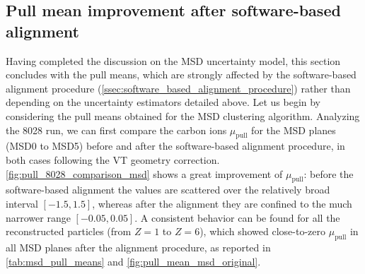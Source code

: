 \subsection{Pull mean improvement after software-based alignment}\label{ssec:pull_mean_improvement_msd}
Having completed the discussion on the MSD uncertainty model, this section concludes with the pull means, which are strongly affected by the software-based alignment procedure (\autoref{ssec:software_based_alignment_procedure}) rather than depending on the uncertainty estimators detailed above. Let us begin by considering the pull means obtained for the MSD clustering algorithm. Analyzing the 8028 run, we can first compare the carbon ions $\mu_\text{pull}$ for the MSD planes (MSD0 to MSD5) before and after the software-based alignment procedure, in both cases following the VT geometry correction. \autoref{fig:pull_8028_comparison_msd} shows a great improvement of $\mu_\text{pull}$: before the software-based alignment the values are scattered over the relatively broad interval $[-1.5,1.5]$, whereas after the alignment they are confined to the much narrower range $[-0.05,0.05]$. A consistent behavior can be found for all the reconstructed particles (from $Z=1$ to $Z=6$), which showed close-to-zero $\mu_\text{pull}$ in all MSD planes after the alignment procedure, as reported in \autoref{tab:msd_pull_means} and \autoref{fig:pull_mean_msd_original}.
\vspace*{\fill}
